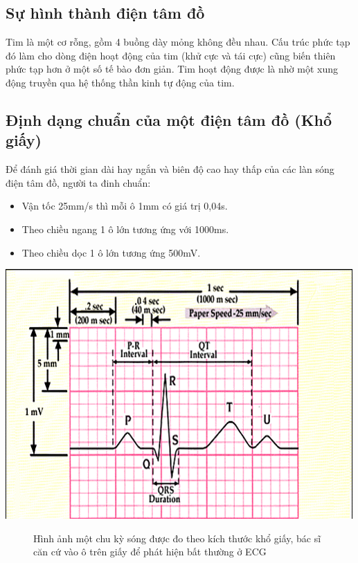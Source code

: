 \subsection{Sự hình thành điện tâm đồ}
Tim là một cơ rỗng, gồm 4 buồng dày mỏng không đều nhau. Cấu trúc phức tạp đó làm cho dòng điện hoạt động của tim (khử cực và tái cực) cũng biến thiên phức tạp hơn ở một số tế bào đơn giản. Tim hoạt động được là nhờ một xung động truyền qua hệ thống thần kinh tự động của tim. \cite{bgdtd}


\subsection{Định dạng chuẩn của một điện tâm đồ (Khổ giấy)}
Để đánh giá thời gian dài hay ngắn và biên độ cao hay thấp của các làn sóng điện tâm đồ, người ta đinh chuẩn: 
\begin{itemize}
    \item Vận tốc 25mm/s thì mỗi ô 1mm có giá trị 0,04s.
    \item Theo chiều ngang 1 ô lớn tương ứng với 1000ms.
    \item Theo chiều dọc 1 ô lớn tương ứng 500mV.
\end{itemize}
\begin{center}
    \includegraphics[scale=.6]{image/week1/new_ecg_paper.png}
    \begin{figure}[htp]
    \begin{center}
    \end{center}
    \caption{Hình ảnh một chu kỳ sóng được đo theo kích thước khổ giấy, bác sĩ căn cứ vào ô trên giấy để phát hiện bất thường ở ECG \cite{ecggiay}}
    \end{figure}
\end{center}


